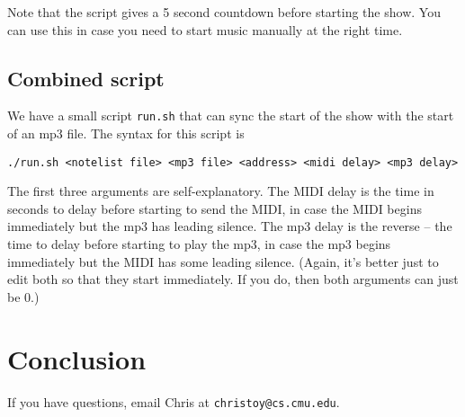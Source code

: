 \documentclass[11pt]{article}
\begin{document}
Note that the script gives a 5 second countdown before starting the
show. You can use this in case you need to start music manually at the
right time.

\subsection{Combined script}

We have a small script \texttt{run.sh} that can sync the start of the
show with the start of an mp3 file. The syntax for this script is

\begin{center}
\texttt{./run.sh <notelist file> <mp3 file> <address> <midi delay>
  <mp3 delay>}
\end{center}

The first three arguments are self-explanatory. The MIDI delay is the
time in seconds to delay before starting to send the MIDI, in case the
MIDI begins immediately but the mp3 has leading silence. The mp3 delay
is the reverse -- the time to delay before starting to play the mp3,
in case the mp3 begins immediately but the MIDI has some leading
silence. (Again, it's better just to edit both so that they start
immediately. If you do, then both arguments can just be 0.)

\section{Conclusion}

If you have questions, email Chris at \texttt{christoy@cs.cmu.edu}.
\end{document}
